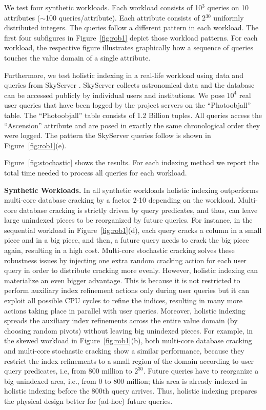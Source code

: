 We test four synthetic workloads.
Each workload consists of 10$^{3}$ queries on 10 attributes ($\sim$100 queries/attribute).
Each attribute consists of 2$^{30}$ uniformly distributed integers.
The queries follow a different pattern in each workload.
The first four subfigures in Figure~\ref{fig:rob1} depict those workload patterns. 
For each workload, the respective figure illustrates graphically 
how a sequence of queries touches the value domain of a single attribute.

Furthermore, we test holistic indexing in a real-life workload using data and queries from SkyServer \cite{SkyServer}.
SkyServer collects astronomical data  and the database can be accessed publicly by individual users and institutions.
We pose $10^4$ real user queries that have been logged by the project servers on the ``Photoobjall'' table.
The ``Photoobjall'' table consists of 1.2 Billion tuples.
All queries access the ``Ascension'' attribute and are posed in exactly the same chronological order they were logged.
The pattern the SkyServer queries follow is shown in Figure~\ref{fig:rob1}(e).

Figure~\ref{fig:stochastic} shows the results.
For each indexing method we report the total time needed to process all queries for each workload.



\textbf{Synthetic Workloads.}
In all synthetic workloads holistic indexing outperforms multi-core database cracking by a factor 2-10 depending on the workload.
Multi-core database cracking is strictly driven by query predicates, and thus, can leave large unindexed pieces to be reorganized by future queries.
For instance, in the sequential workload in Figure~\ref{fig:rob1}(d), each query cracks a column in a small piece and in a big piece, and then, a future query needs to crack the big piece again, resulting in a high cost.
Multi-core stochastic cracking solves these robustness issues by injecting one extra random cracking action for each user query in order to distribute cracking more evenly.
However, holistic indexing can materialize an even bigger advantage. This is because it is not restricted to perform auxiliary index refinement actions only during user queries but it can exploit all possible CPU cycles to refine the indices, resulting in many more actions taking place in parallel with user queries. 
Moreover, holistic indexing spreads the auxiliary index refinements across the entire value domain (by choosing random pivots) without leaving big unindexed pieces.
For example, in the skewed workload in Figure~\ref{fig:rob1}(b), both multi-core database cracking and multi-core stochastic cracking show a similar performance, because they restrict the index refinements to a small region of the domain according to user query predicates, i.e, from 800 million to $2^{30}$.
Future queries have to reorganize a big unindexed area, i.e., from 0 to 800 million; this area is already indexed in holistic indexing before the 800th query arrives.
Thus, holistic indexing prepares the physical design better for (ad-hoc) future queries.



